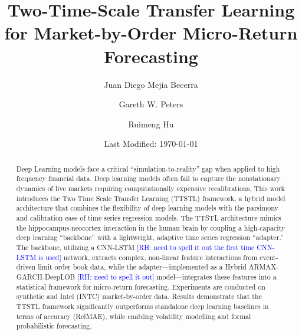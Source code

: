 \documentclass[10pt,a4paper,oneside]{article}
\title{Two-Time-Scale Transfer Learning for Market-by-Order Micro-Return Forecasting}
\author[1]{Juan Diego Mejia Becerra}
\author[1]{Gareth W. Peters}
\author[1,2]{Ruimeng Hu}
\affil[1]{Department of Statistics and Applied Probability, University of California, Santa Barbara}
\affil[2]{Department of Mathematics, University of California, Santa Barbara}
\date{Last Modified: \today}
\newcommand{\rh}[1]{\textcolor{blue}{\textsf{[RH: #1]}}}
\begin{document}
\maketitle
\linenumbers

\begin{abstract}
    Deep Learning models face a critical ``simulation-to-reality'' gap when applied to high frequency financial data. Deep learning models often fail to capture the nonstationary dynamics of live markets requiring computationally expensive recalibrations. This work introduces the Two Time Scale Transfer Learning (TTSTL) framework, a hybrid model architecture that combines the flexibility of deep learning models with the parsimony and calibration ease of time series regression models. The TTSTL architecture mimics the hippocampus-neocortex interaction in the human brain by coupling a high-capacity deep learning ``backbone'' with a lightweight, adaptive time series regression ``adapter.'' The backbone, utilizing a CNN-LSTM \rh{need to spell it out the first time CNN-LSTM is used} network, extracts complex, non-linear feature interactions from event-driven limit order book data, while the adapter—implemented as a Hybrid ARMAX-GARCH-DeepLOB \rh{need to spell it out} model—integrates these features into a statistical framework for micro-return forecasting. Experiments are conducted on synthetic and Intel (INTC) market-by-order data. Results demonstrate that the TTSTL framework significantly outperforms standalone deep learning baselines in terms of accuracy (RelMAE), while enabling volatility modelling and formal probabilistic forecasting.
\end{abstract}

\end{document}
